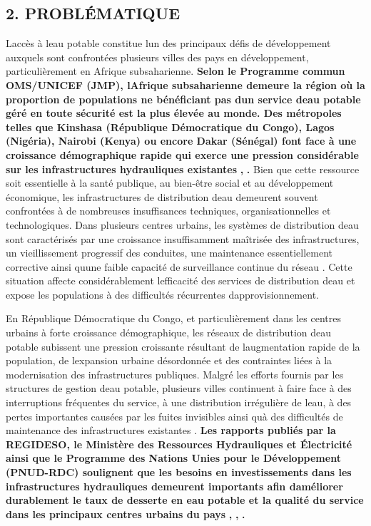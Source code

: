 \documentclass[12pt,a4paper,oneside]{report}
\begin{document}
\subsection{2. PROBLÉMATIQUE}\label{probluxe9matique}

L\textquotesingle accès à l\textquotesingle eau potable constitue
l\textquotesingle un des principaux défis de développement auxquels sont
confrontées plusieurs villes des pays en développement, particulièrement
en Afrique subsaharienne. \textbf{Selon le Programme commun OMS/UNICEF
(JMP), l\textquotesingle Afrique subsaharienne demeure la région où la
proportion de populations ne bénéficiant pas d\textquotesingle un
service d\textquotesingle eau potable géré en toute sécurité est la plus
élevée au monde. Des métropoles telles que Kinshasa (République
Démocratique du Congo), Lagos (Nigéria), Nairobi (Kenya) ou encore Dakar
(Sénégal) font face à une croissance démographique rapide qui exerce une
pression considérable sur les infrastructures hydrauliques existantes}
\cite{ref1}\textbf{,} \cite{ref10}\textbf{.} Bien que cette ressource soit
essentielle à la santé publique, au bien-être social et au développement
économique, les infrastructures de distribution d\textquotesingle eau
demeurent souvent confrontées à de nombreuses insuffisances techniques,
organisationnelles et technologiques. Dans plusieurs centres urbains,
les systèmes de distribution d\textquotesingle eau sont caractérisés par
une croissance insuffisamment maîtrisée des infrastructures, un
vieillissement progressif des conduites, une maintenance essentiellement
corrective ainsi qu\textquotesingle une faible capacité de surveillance
continue du réseau \cite{ref11}. Cette situation affecte considérablement
l\textquotesingle efficacité des services de distribution
d\textquotesingle eau et expose les populations à des difficultés
récurrentes d\textquotesingle approvisionnement.

En République Démocratique du Congo, et particulièrement dans les
centres urbains à forte croissance démographique, les réseaux de
distribution d\textquotesingle eau potable subissent une pression
croissante résultant de l\textquotesingle augmentation rapide de la
population, de l\textquotesingle expansion urbaine désordonnée et des
contraintes liées à la modernisation des infrastructures publiques.
Malgré les efforts fournis par les structures de gestion
d\textquotesingle eau potable, plusieurs villes continuent à faire face
à des interruptions fréquentes du service, à une distribution
irrégulière de l\textquotesingle eau, à des pertes importantes causées
par les fuites invisibles ainsi qu\textquotesingle à des difficultés de
maintenance des infrastructures existantes \cite{ref12}. \textbf{Les
rapports publiés par la REGIDESO, le Ministère des Ressources
Hydrauliques et Électricité ainsi que le Programme des Nations Unies
pour le Développement (PNUD-RDC) soulignent que les besoins en
investissements dans les infrastructures hydrauliques demeurent
importants afin d\textquotesingle améliorer durablement le taux de
desserte en eau potable et la qualité du service dans les principaux
centres urbains du pays} \cite{ref13}\textbf{,} \cite{ref14}\textbf{,}
\cite{ref15}\textbf{.}
\end{document}
